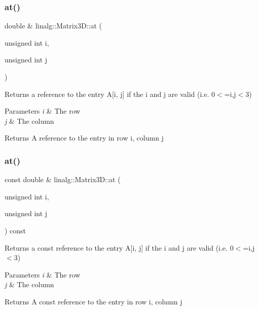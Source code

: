 \subsubsection{\texorpdfstring{at()}{at()}\hspace{0.1cm}{\footnotesize\ttfamily [1/2]}}
{\footnotesize\ttfamily double \& linalg\+::\+Matrix3\+D\+::at (\begin{DoxyParamCaption}\item[{unsigned int}]{i,  }\item[{unsigned int}]{j }\end{DoxyParamCaption})}



Returns a reference to the entry A\mbox{[}i, j\mbox{]} if the i and j are valid (i.\+e. 0$<$=i,j$<$3) 


\begin{DoxyParams}{Parameters}
{\em i} & The row \\
\hline
{\em j} & The column \\
\hline
\end{DoxyParams}
\begin{DoxyReturn}{Returns}
A reference to the entry in row i, column j 
\end{DoxyReturn}
\mbox{\label{classlinalg_1_1Matrix3D_a69d8a6906f27a4b2890e3f3e61e544ca}} 
\subsubsection{\texorpdfstring{at()}{at()}\hspace{0.1cm}{\footnotesize\ttfamily [2/2]}}
{\footnotesize\ttfamily const double \& linalg\+::\+Matrix3\+D\+::at (\begin{DoxyParamCaption}\item[{unsigned int}]{i,  }\item[{unsigned int}]{j }\end{DoxyParamCaption}) const}



Returns a const reference to the entry A\mbox{[}i, j\mbox{]} if the i and j are valid (i.\+e. 0$<$=i,j$<$3) 


\begin{DoxyParams}{Parameters}
{\em i} & The row \\
\hline
{\em j} & The column \\
\hline
\end{DoxyParams}
\begin{DoxyReturn}{Returns}
A const reference to the entry in row i, column j 
\end{DoxyReturn}
\mbox{\label{classlinalg_1_1Matrix3D_aff9083d3f737113ea70ca544bee86d8f}} 
